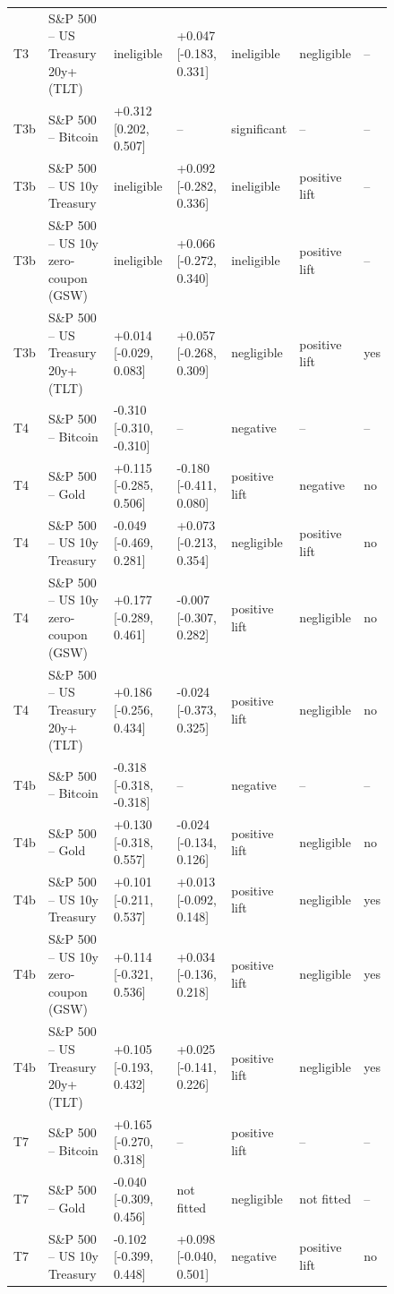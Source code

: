 \begin{figure}[t]
{\begin{tabular}{lllllll}
T3 & S\&P 500 -- US Treasury 20y+ (TLT) & ineligible & +0.047 [-0.183, 0.331] & ineligible & negligible & -- \\
T3b & S\&P 500 -- Bitcoin & +0.312 [0.202, 0.507] & -- & significant & -- & -- \\
T3b & S\&P 500 -- US 10y Treasury & ineligible & +0.092 [-0.282, 0.336] & ineligible & positive lift & -- \\
T3b & S\&P 500 -- US 10y zero-coupon (GSW) & ineligible & +0.066 [-0.272, 0.340] & ineligible & positive lift & -- \\
T3b & S\&P 500 -- US Treasury 20y+ (TLT) & +0.014 [-0.029, 0.083] & +0.057 [-0.268, 0.309] & negligible & positive lift & yes \\
T4 & S\&P 500 -- Bitcoin & -0.310 [-0.310, -0.310] & -- & negative & -- & -- \\
T4 & S\&P 500 -- Gold & +0.115 [-0.285, 0.506] & -0.180 [-0.411, 0.080] & positive lift & negative & no \\
T4 & S\&P 500 -- US 10y Treasury & -0.049 [-0.469, 0.281] & +0.073 [-0.213, 0.354] & negligible & positive lift & no \\
T4 & S\&P 500 -- US 10y zero-coupon (GSW) & +0.177 [-0.289, 0.461] & -0.007 [-0.307, 0.282] & positive lift & negligible & no \\
T4 & S\&P 500 -- US Treasury 20y+ (TLT) & +0.186 [-0.256, 0.434] & -0.024 [-0.373, 0.325] & positive lift & negligible & no \\
T4b & S\&P 500 -- Bitcoin & -0.318 [-0.318, -0.318] & -- & negative & -- & -- \\
T4b & S\&P 500 -- Gold & +0.130 [-0.318, 0.557] & -0.024 [-0.134, 0.126] & positive lift & negligible & no \\
T4b & S\&P 500 -- US 10y Treasury & +0.101 [-0.211, 0.537] & +0.013 [-0.092, 0.148] & positive lift & negligible & yes \\
T4b & S\&P 500 -- US 10y zero-coupon (GSW) & +0.114 [-0.321, 0.536] & +0.034 [-0.136, 0.218] & positive lift & negligible & yes \\
T4b & S\&P 500 -- US Treasury 20y+ (TLT) & +0.105 [-0.193, 0.432] & +0.025 [-0.141, 0.226] & positive lift & negligible & yes \\
T7 & S\&P 500 -- Bitcoin & +0.165 [-0.270, 0.318] & -- & positive lift & -- & -- \\
T7 & S\&P 500 -- Gold & -0.040 [-0.309, 0.456] & not fitted & negligible & not fitted & -- \\
T7 & S\&P 500 -- US 10y Treasury & -0.102 [-0.399, 0.448] & +0.098 [-0.040, 0.501] & negative & positive lift & no \\

\end{tabular}}
\end{figure}
